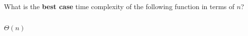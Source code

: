 \begin{prob}
    What is the \textbf{best case} time complexity of the following function in
    terms of $n$?

    \inputminted{python}{./code.py}

    \begin{soln}
        $\Theta(n)$
    \end{soln}

\end{prob}
